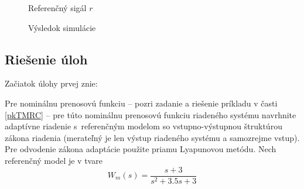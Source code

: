 \documentclass[a4paper, 10pt, ]{article}
\begin{document}
\begin{figure}[t]
	\centering


    \vspace{-4mm}

	\caption{Referenčný sigál $r$}
	\label{Referenčný sigál $r$ 6cv}

    \vspace{-2mm}

\end{figure}



\begin{figure}[t]
	\centering


    \vspace{-4mm}

	\caption{Výsledok simulácie}
	\label{Výsledok simulácie 6cv}

    \vspace{-2mm}

\end{figure}
















\subsection{Riešenie úloh}



Začiatok úlohy prvej znie:




\smallskip

{\color{gray}

Pre nominálnu prenosovú funkciu -- pozri zadanie a riešenie príkladu v časti \ref{pkTMRC} -- pre túto nominálnu prenosovú funkciu riadeného systému navrhnite adaptívne riadenie s~referenčným modelom so vstupno-výstupnou štruktúrou zákona riadenia (merateľný je len výstup riadeného systému a samozrejme vstup). Pre odvodenie zákona adaptácie použite priamu Lyapunovou metódu. Nech referenčný model je v tvare
\begin{equation}
    W_m(s) = \frac{s + 3}{ s^2 + 3.5 s + 3}
\end{equation}

}
\end{document}
